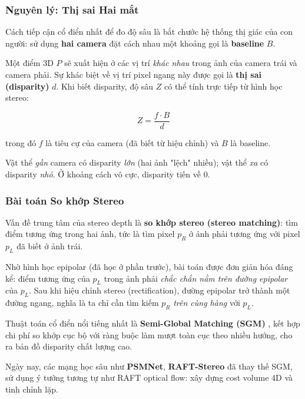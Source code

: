\subsubsection{Nguyên lý: Thị sai Hai mắt}
\label{subsubsec:stereo_principle}

Cách tiếp cận cổ điển nhất để đo độ sâu là bắt chước hệ thống thị giác của con người: sử dụng \textbf{hai camera} đặt cách nhau một khoảng gọi là \textbf{baseline} $B$.

Một điểm 3D $P$ sẽ xuất hiện ở các vị trí \textit{khác nhau} trong ảnh của camera trái và camera phải. Sự khác biệt về vị trí pixel ngang này được gọi là \textbf{thị sai (disparity)} $d$. Khi biết disparity, độ sâu $Z$ có thể tính trực tiếp từ hình học stereo:

\begin{equation}
    Z = \frac{f \cdot B}{d}
    \label{eq:stereo_depth}
\end{equation}

trong đó $f$ là tiêu cự của camera (đã biết từ hiệu chỉnh) và $B$ là baseline.

Vật thể \textit{gần} camera có disparity \textit{lớn} (hai ảnh "lệch" nhiều); vật thể \textit{xa} có disparity \textit{nhỏ}. Ở khoảng cách vô cực, disparity tiến về 0.

\subsubsection{Bài toán So khớp Stereo}
\label{subsubsec:stereo_matching}

Vấn đề trung tâm của stereo depth là \textbf{so khớp stereo (stereo matching)}: tìm điểm tương ứng trong hai ảnh, tức là tìm pixel $p_R$ ở ảnh phải tương ứng với pixel $p_L$ đã biết ở ảnh trái.

Nhờ hình học epipolar (đã học ở phần trước), bài toán được đơn giản hóa đáng kể: điểm tương ứng của $p_L$ trong ảnh phải \textit{chắc chắn nằm trên đường epipolar} của $p_L$. Sau khi hiệu chỉnh stereo (rectification), đường epipolar trở thành một đường ngang, nghĩa là ta chỉ cần tìm kiếm $p_R$ \textit{trên cùng hàng} với $p_L$.

Thuật toán cổ điển nổi tiếng nhất là \textbf{Semi-Global Matching (SGM)} \cite{Hirschmuller2008}, kết hợp chi phí so khớp cục bộ với ràng buộc làm mượt toàn cục theo nhiều hướng, cho ra bản đồ disparity chất lượng cao.

Ngày nay, các mạng học sâu như \textbf{PSMNet}, \textbf{RAFT-Stereo} đã thay thế SGM, sử dụng ý tưởng tương tự như RAFT optical flow: xây dựng cost volume 4D và tinh chỉnh lặp.

